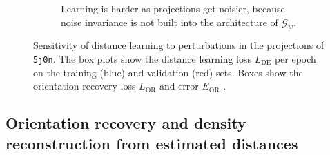 \begin{figure}[ht!]
\begin{subfigure}[t]{0.47\linewidth}
{            Learning is harder as projections get noisier, because noise invariance is not built into the architecture of $\mathcal{G}_w$.
        }\label{fig:results:distance-estimation:noise}
    \end{subfigure}
    \caption{%
        Sensitivity of distance learning to perturbations in the projections of \texttt{5j0n}.
        The box plots show the distance learning loss $L_\text{DE}$ per epoch  on the training (blue) and validation (red) sets.
        Boxes show the orientation recovery loss $L_\text{OR}$  and error $E_\text{OR}$ .
    }
\end{figure}


\subsection{Orientation recovery and density reconstruction from estimated distances}\label{sec:results:orientation-recovery:reconstruction}

